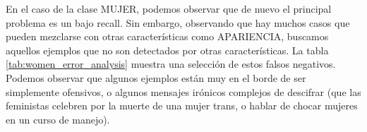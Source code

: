 En el caso de la clase MUJER, podemos observar que de nuevo el principal problema es un bajo recall. Sin embargo, observando que hay muchos casos que pueden mezclarse con otras características como APARIENCIA, buscamos aquellos ejemplos que no son detectados por otras características. La tabla \ref{tab:women_error_analysis} muestra una selección de estos falsos negativos. Podemos observar que algunos ejemplos están muy en el borde de ser simplemente ofensivos, o algunos mensajes irónicos complejos de descifrar (que las feministas celebren por la muerte de una mujer trans, o hablar de chocar mujeres en un curso de manejo).


